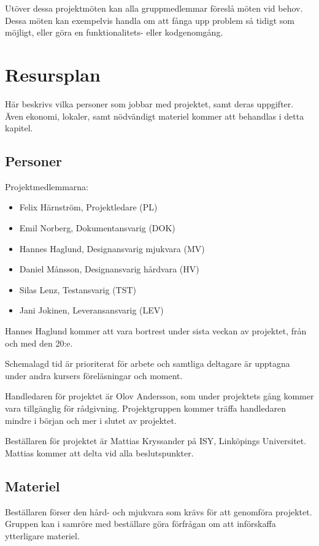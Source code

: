 \documentclass[a4paper,11pt]{article}
\newcommand{\LIPShandledare}{Olov Andersson}
\begin{document}
    Utöver dessa projektmöten kan alla gruppmedlemmar föreslå möten vid behov. Dessa möten kan exempelvis handla om att fånga upp problem så tidigt som möjligt, eller göra en funktionalitets- eller kodgenomgång.
    
    \section{Resursplan}
    Här beskrivs vilka personer som jobbar med projektet, samt deras uppgifter. Även ekonomi, lokaler, samt nödvändigt materiel kommer att behandlas i detta kapitel.
    
    \subsection{Personer}
    Projektmedlemmarna:
    \begin{itemize}
        \item Felix Härnström, Projektledare (PL)
        \item Emil Norberg, Dokumentansvarig (DOK)
        \item Hannes Haglund, Designansvarig mjukvara (MV)
        \item Daniel Månsson, Designansvarig hårdvara (HV)
        \item Silas Lenz, Testansvarig (TST)
        \item Jani Jokinen, Leveransansvarig (LEV)
    \end{itemize}
    Hannes Haglund kommer att vara bortrest under sista veckan av projektet, från och med den 20:e.

    Schemalagd tid är prioriterat för arbete och samtliga deltagare är upptagna under andra kursers föreläsningar och moment.
    
    Handledaren för projektet är \LIPShandledare , som under projektets gång kommer vara tillgänglig för rådgivning. Projektgruppen kommer träffa handledaren mindre i början och mer i slutet av projektet.
    
    Beställaren för projektet är  Mattias Kryssander på ISY, Linköpings Universitet. Mattias kommer att delta vid alla beslutspunkter.
    
    \subsection{Materiel}
    Beställaren förser den hård- och mjukvara som krävs för att genomföra projektet. Gruppen kan i samröre med beställare göra förfrågan om att införskaffa ytterligare materiel. 
    
\end{document}
